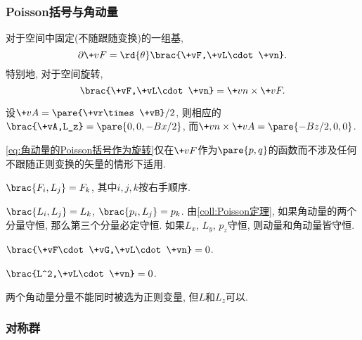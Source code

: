 \documentclass[../TheoreticalMechanics.tex]{subfiles}
\begin{document}

\subsubsection{Poisson括号与角动量} %
\label{ssub:poisson括号与角动量}

\begin{lemma}[向量的无穷小变换]
    对于空间中固定(不随跟随变换)的一组基,
    \[ \partial \+vF = \rd{\theta}\brac{\+vF,\+vL\cdot\+vn}. \]
    特别地, 对于空间旋转,
    \begin{equation}
        \label{eq:角动量的Poisson括号作为旋转}
        \brac{\+vF,\+vL\cdot\+vn} = \+vn\times\+vF. 
    \end{equation}
\end{lemma}
\begin{ex}
    设$\+vA = \pare{\+vr\times\+vB}/2$, 则相应的$\brac{\+vA,L_z} = \pare{0,0,-Bx/2}$, 而$\+vn\times\+vA = \pare{-Bz/2,0,0}$.
\end{ex}
\begin{pitfall}
    \eqref{eq:角动量的Poisson括号作为旋转}仅在$\+vF$作为$\pare{p,q}$的函数而不涉及任何不跟随正则变换的矢量的情形下适用.
\end{pitfall}
\begin{theorem}[角动量的Poisson括号作为指标置换]
    $\brac{F_i,L_j} = F_k$, 其中$i,j,k$按右手顺序.
\end{theorem}
\begin{corollary}[Poisson括号作为置换]
    $\brac{L_i,L_j} = L_k$, $\brac{p_i,L_j}=p_k$. 由\cref{coll:Poisson定理}, 如果角动量的两个分量守恒, 那么第三个分量必定守恒. 如果$L_x$, $L_y$, $p_z$守恒, 则动量和角动量皆守恒.
\end{corollary}
\begin{theorem}[角动量的Poisson括号消灭标量]
    $\brac{\+vF\cdot\+vG,\+vL\cdot\+vn} = 0$.
\end{theorem}
\begin{corollary}[$L^2$与$\+vL$对易]
    $\brac{L^2,\+vL\cdot\+vn} = 0$.
\end{corollary}
\begin{remark}
    两个角动量分量不能同时被选为正则变量, 但$L$和$L_z$可以.
\end{remark}


\subsubsection{对称群} %
\label{ssub:对称群}
\end{document}
